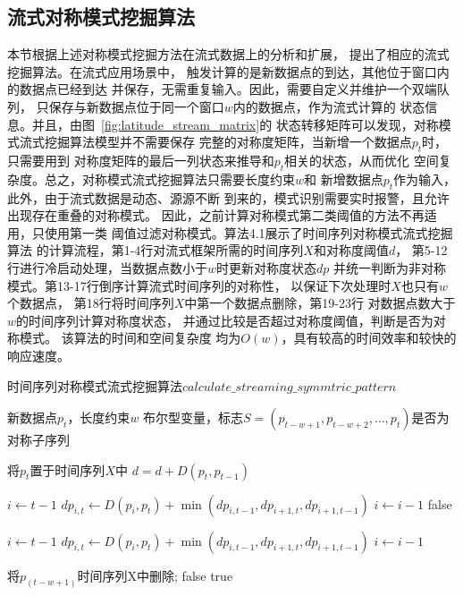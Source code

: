 \subsection{流式对称模式挖掘算法}
本节根据上述对称模式挖掘方法在流式数据上的分析和扩展，
提出了相应的流式挖掘算法。在流式应用场景中，
触发计算的是新数据点的到达，其他位于窗口内的数据点已经到达
并保存，无需重复输入。因此，需要自定义并维护一个双端队列，
只保存与新数据点位于同一个窗口$w$内的数据点，作为流式计算的
状态信息。并且，由图~\ref{fig:latitude_stream_matrix}的
状态转移矩阵可以发现，对称模式流式挖掘算法模型并不需要保存
完整的对称度矩阵，当新增一个数据点$p_t$时，只需要用到
对称度矩阵的最后一列状态来推导和$p_t$相关的状态，从而优化
空间复杂度。总之，对称模式流式挖掘算法只需要长度约束$w$和
新增数据点$p_t$作为输入，此外，由于流式数据是动态、源源不断
到来的，模式识别需要实时报警，且允许出现存在重叠的对称模式。
因此，之前计算对称模式第二类阈值的方法不再适用，只使用第一类
阈值过滤对称模式。算法4.1展示了时间序列对称模式流式挖掘算法
的计算流程，第1-4行对流式框架所需的时间序列$X$和对称度阈值$d$，
第5-12行进行冷启动处理，当数据点数小于$w$时更新对称度状态$dp$
并统一判断为非对称模式。第13-17行倒序计算流式时间序列的对称性，
以保证下次处理时$X$也只有$w$个数据点，
第18行将时间序列$X$中第一个数据点删除，第19-23行
对数据点数大于$w$的时间序列计算对称度状态，
并通过比较是否超过对称度阈值，判断是否为对称模式。
该算法的时间和空间复杂度
均为$O\left(w\right)$，具有较高的时间效率和较快的响应速度。

\renewcommand{\algorithmicrequire}{\textbf{输入：}\unskip}
\renewcommand{\algorithmicensure}{\textbf{输出：}\unskip}

\begin{algorithm}
  \caption{时间序列对称模式流式挖掘算法$calculate\_streaming\_symmtric\_pattern$}
  \label{alg:streaming_symmetric_pattern}
  \small
  \begin{algorithmic}
    \REQUIRE 新数据点$p_t$，长度约束$w$
    \ENSURE 布尔型变量，标志$S=\left(p_{t-w+1},p_{t-w+2},…,p_t \right)$是否为对称子序列

    \STATE 将$p_t$置于时间序列$X$中
      \STATE $d=d+D\left(p_{t}, p_{t-1}\right)$
    \ENDIF

      \STATE $i \leftarrow t-1$
        \STATE $dp_{i,t} \leftarrow D\left(p_{i}, p_{t} \right) + \min \left(dp_{i,t-1},dp_{i+1,t},dp_{i+1,t-1}\right)$
        \STATE $i \leftarrow i-1$
      \ENDWHILE
      \RETURN false
    \ENDIF

    \STATE $i \leftarrow t-1$
      \STATE $dp_{i,t} \leftarrow D\left(p_{i}, p_{t} \right) + \min \left(dp_{i,t-1},dp_{i+1,t},dp_{i+1,t-1}\right)$
      \STATE $i \leftarrow i-1$
    \ENDWHILE

    \STATE 将$p_(t-w+1)$时间序列X中删除;
      \RETURN false
    \ELSE
      \RETURN true
    \ENDIF
  \end{algorithmic}
\end{algorithm}

